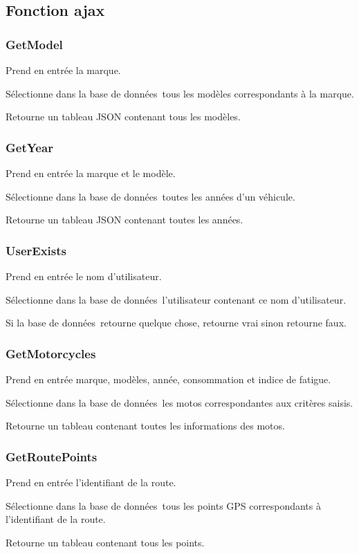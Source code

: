 \documentclass[a4paper]{article}
\newcommand{\bdd}{base de données}
\begin{document}
\subsection{Fonction ajax}

\subsubsection{GetModel}
Prend en entrée la marque.

Sélectionne dans la \bdd \ tous les modèles correspondants à la marque.

Retourne un tableau JSON contenant tous les modèles.

\subsubsection{GetYear}	
Prend en entrée la marque et le modèle.

Sélectionne dans la \bdd \ toutes les années d'un véhicule.

Retourne un tableau JSON contenant toutes les années.

\subsubsection{UserExists}
Prend en entrée le nom d'utilisateur.

Sélectionne dans la \bdd \ l'utilisateur contenant ce nom d'utilisateur.

Si la \bdd \ retourne quelque chose, retourne vrai sinon retourne faux.


\subsubsection{GetMotorcycles}
Prend en entrée marque, modèles, année, consommation et indice de fatigue.

Sélectionne dans la \bdd \ les motos correspondantes aux critères saisis.

Retourne un tableau contenant toutes les informations des motos.

\subsubsection{GetRoutePoints}
Prend en entrée l'identifiant de la route.

Sélectionne dans la \bdd \ tous les points GPS correspondants à l'identifiant de la route.

Retourne un tableau contenant tous les points.
\end{document}
